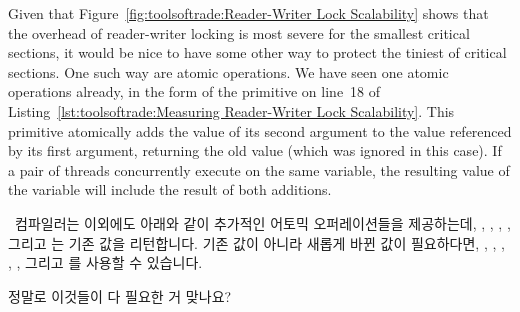 Given that
Figure~\ref{fig:toolsoftrade:Reader-Writer Lock Scalability}
shows that the overhead of reader-writer locking is most severe for the
smallest critical sections, it would be nice to have some other way
to protect the tiniest of critical sections.
One such way are atomic operations.
We have seen one atomic operations already, in the form of the
 primitive on line~18 of
Listing~\ref{lst:toolsoftrade:Measuring Reader-Writer Lock Scalability}.
This primitive atomically adds the value of its second argument to
the value referenced by its first argument, returning the old value
(which was ignored in this case).
If a pair of threads concurrently execute  on
the same variable, the resulting value of the variable will include
the result of both additions.
\fi

\GNUC\ 컴파일러는 이외에도 아래와 같이 추가적인 어토믹 오퍼레이션들을
제공하는데,
,
,
,
, 그리고
 는 기존 값을 리턴합니다.
기존 값이 아니라 새롭게 바뀐 값이 필요하다면,
,
,
,
,
, 그리고
 를 사용할 수 있습니다.

\QuickQuiz{}
	정말로 이것들이 다 필요한 거 맞나요?
	\iffalse

